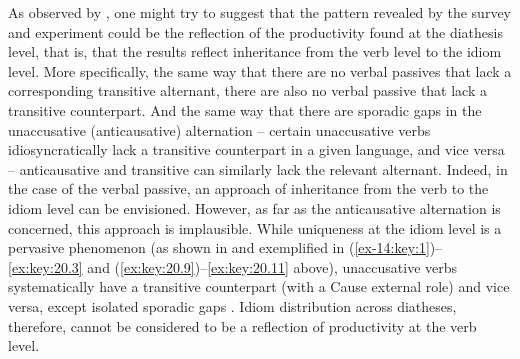 \documentclass[output=paper]{langsci/langscibook}
\begin{document}
As observed by \textcite{SilHorKluWex2018}, one might try to suggest that the
pattern revealed by the survey and experiment could be the reflection of the
productivity found at the diathesis level, that is, that the results reflect
inheritance from the verb level to the idiom level. More specifically, the same
way that there are no verbal passives that lack a corresponding transitive
alternant, there are also no verbal passive  that lack a transitive
counterpart. And the same way that there are sporadic gaps in the unaccusative
(anticausative) alternation – certain unaccusative verbs idiosyncratically lack
a transitive counterpart in a given language, and vice versa – anticausative
and transitive  can similarly lack the relevant alternant. Indeed, in the
case of the verbal passive, an approach of inheritance from the verb to the
idiom level can be envisioned. However, as far as the anticausative alternation
is concerned, this approach is implausible. While uniqueness at the idiom level
is a pervasive phenomenon (as shown in  and exemplified in
(\ref{ex-14:key:1})--\eqref{ex:key:20.3} and
(\ref{ex:key:20.9})--\eqref{ex:key:20.11} above), unaccusative verbs systematically have a
transitive counterpart (with a Cause external role) and vice versa, except
isolated sporadic gaps \parencite{Haspelmath1993,Reinhart2002}.  Idiom
distribution across diatheses, therefore, cannot be considered to be a
reflection of productivity at the verb level.
\end{document}
